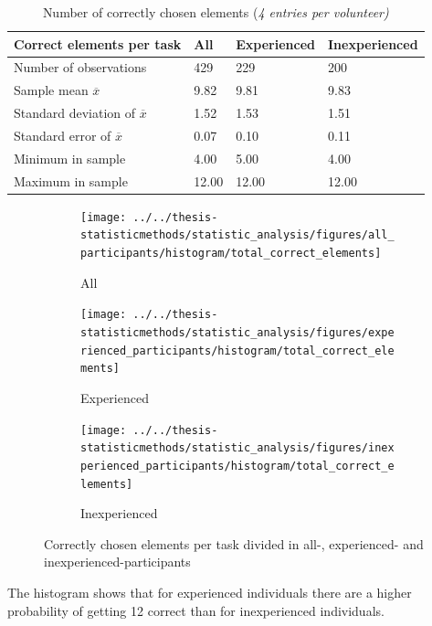 \begin{table}[H]
	\centering
	\begin{tabular}{l|l|l|l}
		Correct elements per task  & All  & Experienced & Inexperienced \\ \hline
		Number of observations & 429    & 229  & 200   \\
		Sample mean $\overline{x}$   & 9.82 & 9.81  & 9.83  \\
		Standard deviation of $\overline{x}$   & 1.52  & 1.53  &  1.51 \\
		Standard error of $\overline{x}$   & 0.07  & 0.10 &  0.11 \\
		Minimum in sample & 4.00 & 5.00  &  4.00  \\
		Maximum in sample  & 12.00 & 12.00  & 12.00  \\ \hline
	\end{tabular}
	\caption[Correct elements, all participants and all tasks]{Number of correctly chosen elements (\textit{4 entries per volunteer)}}
	\label{tab:totalcorrect_all}
\end{table}

\begin{figure}[H]
	\centering
	\begin{subfigure}[b]{0.32\textwidth}
		\centering
		\texttt{[image: ../../thesis-statisticmethods/statistic\_analysis/figures/all\_participants/histogram/total\_correct\_elements]}
		\caption{All}
		\label{fig:totalcorrectelements_all}
	\end{subfigure}
	\begin{subfigure}[b]{0.32\textwidth}
		\centering
		\texttt{[image: ../../thesis-statisticmethods/statistic\_analysis/figures/experienced\_participants/histogram/total\_correct\_elements]}
		\caption{Experienced}
		\label{fig:totalcorrectelements_experienced}
	\end{subfigure}
	\begin{subfigure}[b]{0.32\textwidth}
		\centering
		\texttt{[image: ../../thesis-statisticmethods/statistic\_analysis/figures/inexperienced\_participants/histogram/total\_correct\_elements]}
		\caption{Inexperienced}
		\label{fig:totalcorrectelements_inexperienced}
	\end{subfigure}
	\caption[Correct elements, participants sorted]{Correctly chosen elements per task divided in  all-, experienced- and inexperienced-participants}
\end{figure}

The histogram shows that for experienced individuals there are a higher probability of getting 12 correct than for inexperienced individuals. 

